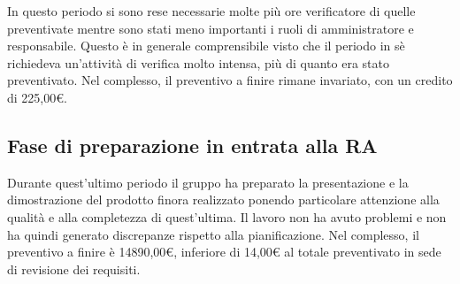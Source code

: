 \documentclass[../piano-di-progetto.tex]{subfiles}
\begin{document}
In questo periodo si sono rese necessarie molte più ore verificatore di quelle preventivate mentre sono stati meno importanti i ruoli di amministratore e responsabile.
Questo è in generale comprensibile visto che il periodo in sè richiedeva un'attività di verifica molto intensa, più di quanto era stato preventivato.
Nel complesso, il preventivo a finire rimane invariato, con un credito di 225,00€.

\subsection{Fase di preparazione in entrata alla RA}%
\label{sub:preventivo_a_finire/fase_di_incremento_4}

Durante quest'ultimo periodo il gruppo ha preparato la presentazione e la dimostrazione del prodotto finora realizzato ponendo particolare attenzione alla qualità e alla completezza di quest'ultima.
Il lavoro non ha avuto problemi e non ha quindi generato discrepanze rispetto alla pianificazione.
Nel complesso, il preventivo a finire è 14890,00€, inferiore di 14,00€ al totale preventivato in sede di revisione dei requisiti.
\end{document}
